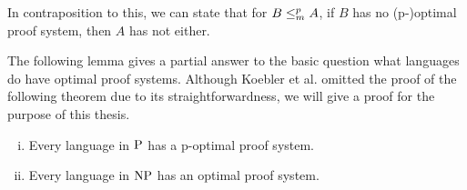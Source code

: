   In contraposition to this, we can state that for \(B \redmany A\), if \(B\) has no (p-)optimal proof system, then \(A\) has not either.

  The following lemma gives a partial answer to the basic question what languages do have optimal proof systems. Although Koebler et al. omitted the proof of the following theorem due to its straightforwardness, we will give a proof for the purpose of this thesis.

  \begin{lemma} \label{lemPHasOptimalProofSystem}
   \begin{enumerate}[(i)]
    \item Every language in \(\P\) has a p-optimal proof system.
    \item Every language in \(\NP\) has an optimal proof system.
   \end{enumerate}
  \end{lemma}

